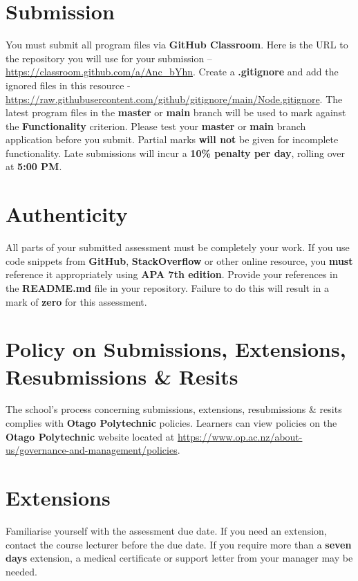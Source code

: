 \documentclass{article}
\begin{document}
\section*{Submission}
You must submit all program files via \textbf{GitHub Classroom}. Here is the URL to the repository you will use for your submission – \href{https://classroom.github.com/a/Anc\_bYhn}{https://classroom.github.com/a/Anc\_bYhn}. Create a \textbf{.gitignore} and add the ignored files in this resource - \href{https://raw.githubusercontent.com/github/gitignore/main/Node.gitignore}{https://raw.githubusercontent.com/github/gitignore/main/Node.gitignore}. The latest program files in the \textbf{master} or \textbf{main} branch will be used to mark against the \textbf{Functionality} criterion. Please test your \textbf{master} or \textbf{main} branch application before you submit. Partial marks \textbf{will not} be given for incomplete functionality. Late submissions will incur a \textbf{10\% penalty per day}, rolling over at \textbf{5:00 PM}.

\section*{Authenticity}
All parts of your submitted assessment must be completely your work. If you use code snippets from \textbf{GitHub}, \textbf{StackOverflow} or other online resource, you \textbf{must} reference it appropriately using \textbf{APA 7th edition}. Provide your references in the \textbf{README.md} file in your repository. Failure to do this will result in a mark of \textbf{zero} for this assessment.

\section*{Policy on Submissions, Extensions, Resubmissions \& Resits}
The school's process concerning submissions, extensions, resubmissions \& resits complies with \textbf{Otago Polytechnic} policies. Learners can view policies on the \textbf{Otago Polytechnic} website located at \href{https://www.op.ac.nz/about-us/governance-and-management/policies}{https://www.op.ac.nz/about-us/governance-and-management/policies}.

\section*{Extensions}
Familiarise yourself with the assessment due date. If you need an extension, contact the course lecturer before the due date. If you require more than a \textbf{seven days} extension, a medical certificate or support letter from your manager may be needed.
\end{document}
